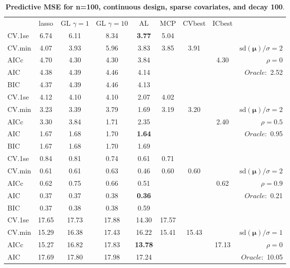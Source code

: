 \begin{table}\vspace{-.5cm}
\caption[l]{ { \bf Predictive MSE for n=100, continuous design, 
sparse covariates, and  decay  100}.}
\vspace{-.5cm}
\footnotesize{}
\begin{center}
\begin{tabular}{l*{7}{c}|r}
 & lasso & GL $\gamma=1$ & GL $\gamma=10$ & AL & MCP  & CVbest & ICbest  \\
\cline{1-9}
CV.1se & 6.74 & 6.11 & 8.34 & {\bf 3.77} & 5.04 & & & \\
CV.min & 4.07 & 3.93 & 5.96 & 3.83 & 3.85 & 3.91 & & $\mathrm{sd}(\mathbf{\mu})/\sigma=2$ \\
AICc & 4.70 & 4.30 & 4.30 & 3.84 & & & 4.30 &  $\rho=0$ \\
AIC & 4.38 & 4.39 & 4.46 & 4.14 & & & &  \multirow{2}{*}{$Oracle: $ 2.52} \\
BIC & 4.37 & 4.39 & 4.46 & 4.13 & & & &  \\
 \hline 
CV.1se & 4.12 & 4.10 & 4.10 & 2.07 & 4.02 & & & \\
CV.min & 3.23 & 3.39 & 3.79 & 1.69 & 3.19 & 3.20 & & $\mathrm{sd}(\mathbf{\mu})/\sigma=2$ \\
AICc & 3.30 & 3.84 & 1.71 & 2.35 & & & 2.40 &  $\rho=0.5$ \\
AIC & 1.67 & 1.68 & 1.70 & {\bf 1.64} & & & &  \multirow{2}{*}{$Oracle: $ 0.95} \\
BIC & 1.67 & 1.68 & 1.70 & 1.69 & & & &  \\
 \hline 
CV.1se & 0.84 & 0.81 & 0.74 & 0.61 & 0.71 & & & \\
CV.min & 0.61 & 0.61 & 0.63 & 0.46 & 0.60 & 0.60 & & $\mathrm{sd}(\mathbf{\mu})/\sigma=2$ \\
AICc & 0.62 & 0.75 & 0.66 & 0.51 & & & 0.62 &  $\rho=0.9$ \\
AIC & 0.37 & 0.37 & 0.38 & {\bf 0.36} & & & &  \multirow{2}{*}{$Oracle: $ 0.21} \\
BIC & 0.37 & 0.38 & 0.38 & 0.59 & & & &  \\
 \hline 
CV.1se & 17.65 & 17.73 & 17.88 & 14.30 & 17.57 & & & \\
CV.min & 15.29 & 16.38 & 17.43 & 16.22 & 15.41 & 15.43 & & $\mathrm{sd}(\mathbf{\mu})/\sigma=1$ \\
AICc & 15.27 & 16.82 & 17.83 & {\bf 13.78} & & & 17.13 &  $\rho=0$ \\
AIC & 17.69 & 17.80 & 17.98 & 17.24 & & & &  \multirow{2}{*}{$Oracle: $ 10.05} \\

\end{tabular}
\end{center}
\end{table}
